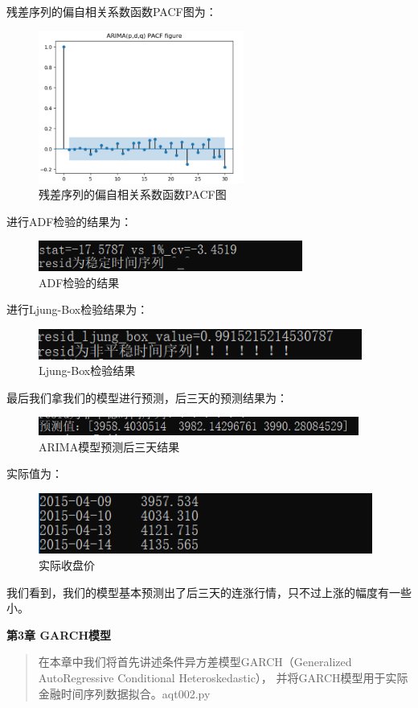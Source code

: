 \documentclass{article}
\begin{document}
残差序列的偏自相关系数函数PACF图为：
\begin{figure}[H]
	\caption{残差序列的偏自相关系数函数PACF图}
	\label{f000026}
	\centering
	\includegraphics[height=5cm]{images/f000026}
\end{figure}
进行ADF检验的结果为：
\begin{figure}[H]
	\caption{ADF检验的结果}
	\label{f000027}
	\centering
	\includegraphics[height=1cm]{images/f000027}
\end{figure}
进行Ljung-Box检验结果为：
\begin{figure}[H]
	\caption{Ljung-Box检验结果}
	\label{f000028}
	\centering
	\includegraphics[height=1cm]{images/f000028}
\end{figure}
最后我们拿我们的模型进行预测，后三天的预测结果为：
\begin{figure}[H]
	\caption{ARIMA模型预测后三天结果}
	\label{f000029}
	\centering
	\includegraphics[height=0.6cm]{images/f000029}
\end{figure}
实际值为：
\begin{figure}[H]
	\caption{实际收盘价}
	\label{f000030}
	\centering
	\includegraphics[height=2cm]{images/f000030}
\end{figure}
我们看到，我们的模型基本预测出了后三天的连涨行情，只不过上涨的幅度有一些小。

\maketitle\begin{center}
\Large \textbf{第3章 GARCH模型}
\end{center}
\begin{abstract}
在本章中我们将首先讲述条件异方差模型GARCH（Generalized AutoRegressive Conditional Heteroskedastic），
并将GARCH模型用于实际金融时间序列数据拟合。aqt002.py
\end{abstract}
\end{document}
